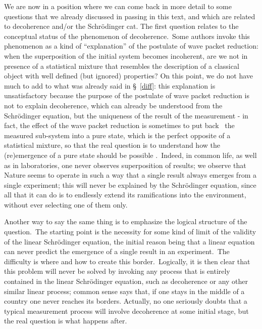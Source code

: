 \documentclass[12pt,onecolumn]{article}%
\begin{document}
We are now in a position where we can come back in more detail to some
questions that we already discussed in passing in this text, and which are
related to decoherence and/or the Schr\"{o}dinger cat. The first question
relates to the conceptual status of the phenomenon of decoherence.\ Some
authors invoke this phenomenon as a kind of ``explanation'' of the postulate
of wave packet reduction: when the superposition of the initial system becomes
incoherent, are we not in presence of a statistical mixture that resembles the
description of a classical object with well defined (but ignored) properties?
On this point, we do not have much to add to what was already said in
\S \ \ref{diff}: this explanation is unsatisfactory because the purpose of the
postulate of wave packet reduction is not to explain decoherence, which can
already be understood from the Schr\"{o}dinger equation, but the uniqueness of
the result of the measurement - in fact, the effect of the wave packet
reduction is sometimes to put back \ the measured sub-system into a pure
state, which is the perfect opposite of a statistical mixture, so that the
real question is to understand how the (re)emergence of a pure state should be
possible \cite{London-Bauer}.\ Indeed, in common life, as well as in
laboratories, one never observes superposition of results; we observe that
Nature seems to operate in such a way that a single result always emerges from
a single experiment; this will never be explained by the Schr\"{o}dinger
equation, since all that it can do is to endlessly extend its ramifications
into the environment, without ever selecting one of them only.

Another way to say the same thing is to emphasize the logical structure of the
question.\ The starting point is the necessity for some kind of limit of the
validity of the linear Schr\"{o}dinger equation, the initial reason being that
a linear equation can never predict the emergence of a single result in an
experiment.\ The difficulty is where and how to create this
border.\ Logically, it is then clear that this problem will never be solved by
invoking any process that is entirely contained in the linear Schr\"{o}dinger
equation, such as decoherence or any other similar linear process; common
sense says that, if one stays in the middle of a country one never reaches its
borders. Actually, no one seriously doubts that a typical measurement process
will involve decoherence at some initial stage, but the real question is what
happens after.
\end{document}
